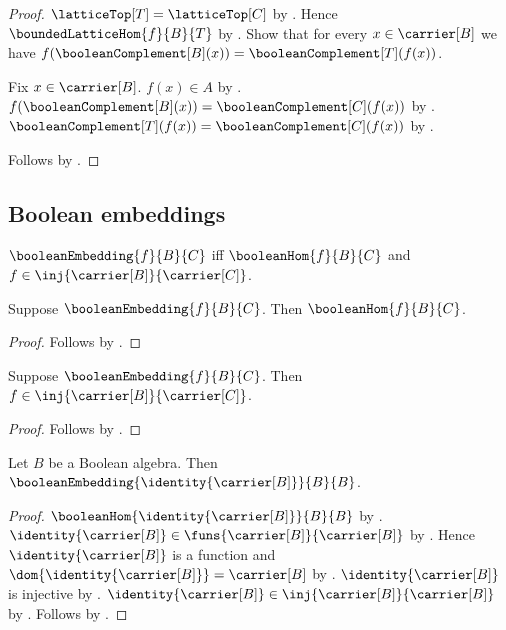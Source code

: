 \begin{proof}
        $\latticeTop[T]=\latticeTop[C]$ by
        .
    Hence $\boundedLatticeHom{f}{B}{T}$ by
        .
    Show that for every $x\in\carrier[B]$ we have
        $f(\booleanComplement[B](x))
            =\booleanComplement[T](f(x))$.
    \begin{subproof}
        Fix $x\in\carrier[B]$.
        $f(x)\in A$ by .
        $f(\booleanComplement[B](x))
            =\booleanComplement[C](f(x))$ by
            .
        $\booleanComplement[T](f(x))
            =\booleanComplement[C](f(x))$ by
            .
    \end{subproof}
    Follows by .
\end{proof}

\subsection{Boolean embeddings}

\begin{definition}\label{boolean_embedding}
    $\booleanEmbedding{f}{B}{C}$ iff
        $\booleanHom{f}{B}{C}$ and
        $f\in\inj{\carrier[B]}{\carrier[C]}$.
\end{definition}

\begin{proposition}\label{boolean_embedding_is_hom}
    Suppose $\booleanEmbedding{f}{B}{C}$.
    Then $\booleanHom{f}{B}{C}$.
\end{proposition}
\begin{proof}
    Follows by .
\end{proof}

\begin{proposition}\label{boolean_embedding_injective}
    Suppose $\booleanEmbedding{f}{B}{C}$.
    Then $f\in\inj{\carrier[B]}{\carrier[C]}$.
\end{proposition}
\begin{proof}
    Follows by .
\end{proof}

\begin{proposition}\label{identity_boolean_embedding}
    Let $B$ be a Boolean algebra.
    Then $\booleanEmbedding{\identity{\carrier[B]}}{B}{B}$.
\end{proposition}
\begin{proof}
    $\booleanHom{\identity{\carrier[B]}}{B}{B}$ by
        .
    $\identity{\carrier[B]}\in
        \funs{\carrier[B]}{\carrier[B]}$ by .
    Hence $\identity{\carrier[B]}$ is a function and
        $\dom{\identity{\carrier[B]}}=\carrier[B]$ by
        .
    $\identity{\carrier[B]}$ is injective by
        .
    $\identity{\carrier[B]}\in
        \inj{\carrier[B]}{\carrier[B]}$ by
        .
    Follows by .
\end{proof}

